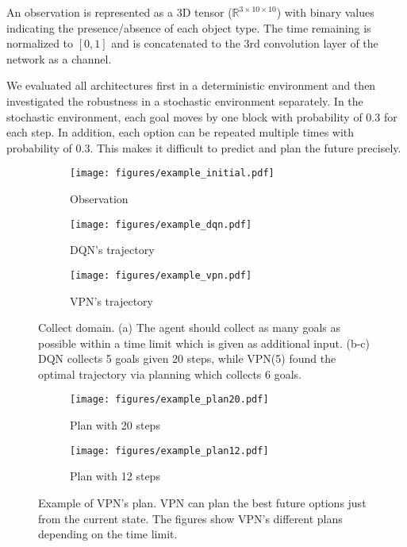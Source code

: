 \documentclass{article}
\begin{document}
An observation is represented as a 3D tensor ($\mathbb{R}^{3 \times 10 \times 10}$) with binary values indicating the presence/absence of each object type. The time remaining is normalized to $[0,1]$ and is concatenated to the 3rd convolution layer of the network as a channel. 

We evaluated all architectures first in a deterministic environment and then investigated the robustness in a stochastic environment separately. In the stochastic environment, each goal moves by one block with probability of 0.3 for each step. In addition, each option can be repeated multiple times with probability of 0.3. This makes it difficult to predict and plan the future precisely.


\begin{figure}[t]
\centering
\begin{minipage}{.57\textwidth}
    \begin{subfigure}{0.32\linewidth}
    	\centering
	    \texttt{[image: figures/example\_initial.pdf]}  
	    \caption{Observation}
   	\end{subfigure}
   	\begin{subfigure}{0.32\linewidth}
    		\centering
	    \texttt{[image: figures/example\_dqn.pdf]} 
	    \caption{DQN's trajectory}
   	\end{subfigure}
	\begin{subfigure}{0.32\linewidth}
    		\centering
	    \texttt{[image: figures/example\_vpn.pdf]}  
	    \caption{VPN's trajectory}
   	\end{subfigure}
   	\vspace{-5pt}
   	\caption{Collect domain. (a) The agent should collect as many goals as possible within a time limit which is given as additional input. (b-c) DQN collects 5 goals given 20 steps, while VPN(5) found the optimal trajectory via planning which collects 6 goals. }
    \label{fig:collect}
\end{minipage}\hfill
\begin{minipage}{.39\textwidth}
  \centering
  \begin{subfigure}{0.49\linewidth}
    		\centering
	    \texttt{[image: figures/example\_plan20.pdf]}  
	    \caption{Plan with 20 steps}
   	\end{subfigure}
   	\begin{subfigure}{0.49\linewidth}
    	\centering
	    \texttt{[image: figures/example\_plan12.pdf]}
	    \caption{Plan with 12 steps}
   	\end{subfigure}
   	\vspace{-5pt}
  \caption{Example of VPN's plan. VPN can plan the best future options just from the current state. The figures show VPN's different plans depending on the time limit.}
  \label{fig:example}
\end{minipage}
\vspace{-13pt}
\end{figure}
\end{document}

